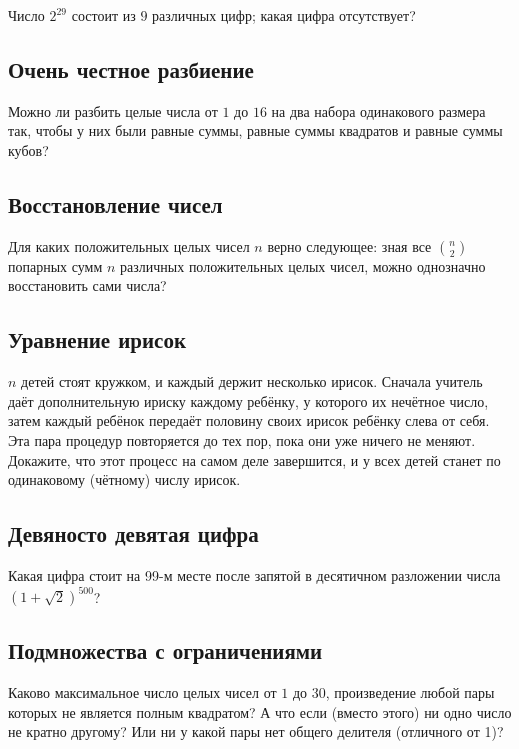 Число $2^{29}$ состоит из $9$ различных цифр; какая цифра отсутствует?

\subsection*{Очень честное разбиение}

Можно ли разбить целые числа от $1$ до $16$ на два набора одинакового размера так,
чтобы у них были равные суммы, равные суммы квадратов и равные суммы кубов?

\subsection*{Восстановление чисел}
Для каких положительных целых чисел $n$ верно следующее: зная все $\binom n2$ попарных сумм $n$ различных положительных целых чисел, можно однозначно восстановить сами числа?


\subsection*{Уравнение ирисок}

$n$ детей стоят кружком, и каждый держит несколько ирисок.
Сначала учитель даёт дополнительную ириску каждому ребёнку, у которого их нечётное число,
затем каждый ребёнок передаёт половину своих ирисок ребёнку слева от себя.
Эта пара процедур повторяется до тех пор, пока они уже ничего не меняют.
Докажите, что этот процесс на самом деле завершится, и у всех детей станет по одинаковому (чётному) числу ирисок.

\subsection*{Девяносто девятая цифра}

Какая цифра стоит на 99-м месте после запятой в десятичном разложении числа 
$(1+\sqrt2)^{500}$?

\subsection*{Подмножества с ограничениями}

Каково максимальное число целых чисел от $1$ до $30$, произведение любой пары которых не является полным квадратом?
А что если (вместо этого) ни одно число не кратно другому?
Или ни у какой пары нет общего делителя (отличного от 1)?

